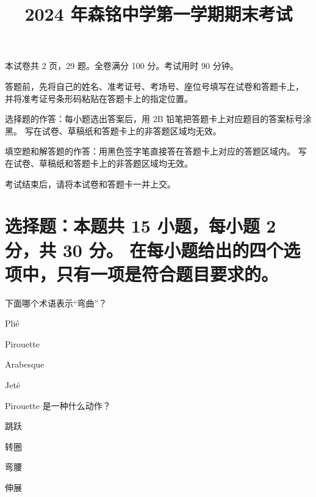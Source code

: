 \documentclass{exam-zh}
\title{2024 年森铭中学第一学期期末考试}
\begin{document}

\secret

\maketitle

本试卷共 2 页，29 题。全卷满分 100 分。考试用时 90 分钟。


\begin{notice}
  \item 答题前，先将自己的姓名、准考证号、考场号、座位号填写在试卷和答题卡上，
    并将准考证号条形码粘贴在答题卡上的指定位置。
  \item 选择题的作答：每小题选出答案后，用 2B 铅笔把答题卡上对应题目的答案标号涂黑。
    写在试卷、草稿纸和答题卡上的非答题区域均无效。
  \item 填空题和解答题的作答：用黑色签字笔直接答在答题卡上对应的答题区域内。
    写在试卷、草稿纸和答题卡上的非答题区域均无效。
  \item 考试结束后，请将本试卷和答题卡一并上交。
\end{notice}





\section{%
  选择题：本题共 15 小题，每小题 2 分，共 30 分。
  在每小题给出的四个选项中，只有一项是符合题目要求的。
}





  \begin{question}[points = 2]
    下面哪个术语表示“弯曲”？
    \begin{choices}
    \item Plié
    \item Pirouette
    \item Arabesque
    \item Jeté
    \end{choices}
    \end{question}
    
    \begin{question}[points = 2]
    Pirouette 是一种什么动作？
    \begin{choices}
    \item 跳跃
    \item 转圈
    \item 弯腰
    \item 伸展
    \end{choices}
    \end{question}
    
\end{document}
